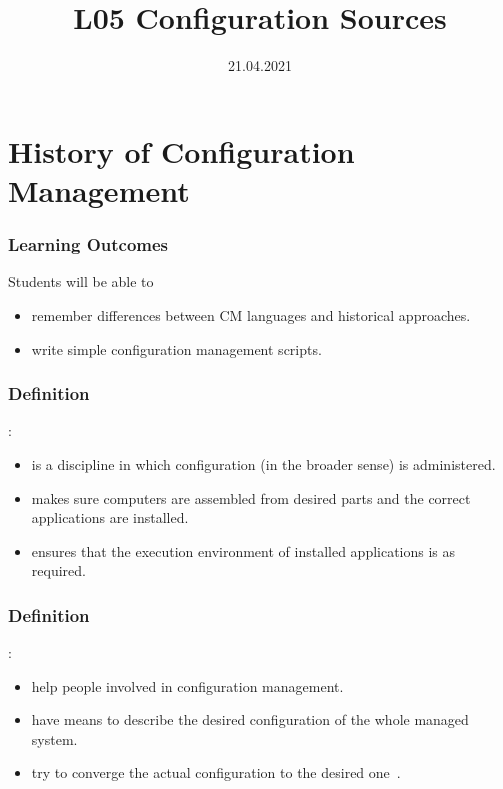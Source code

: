 

\title{L05 Configuration Sources}
\date{21.04.2021}




\section{History of Configuration Management}

\begin{frame}
	\frametitle{Learning Outcomes}
	Students will be able to
	\begin{itemize}
	\item remember differences between CM languages and historical approaches.
	\item write simple configuration management scripts.
	\end{itemize}
\end{frame}

\begin{frame}
	\frametitle{Definition}

	:

	\begin{itemize}
	\item is a discipline in which configuration (in the broader sense) is administered.
	\item makes sure computers are assembled from desired parts and the correct applications are installed.
	\item ensures that the execution environment of installed applications is as required.
	\end{itemize}
\end{frame}


\begin{frame}
	\frametitle{Definition}

	:

	\pause

	\begin{itemize}
	\item help people involved in configuration management.
	\item have means to describe the desired configuration of the whole managed system.
	\item try to converge the actual configuration to the desired one~\cite{burgess1995cfengine}.
	\end{itemize}
\end{frame}



